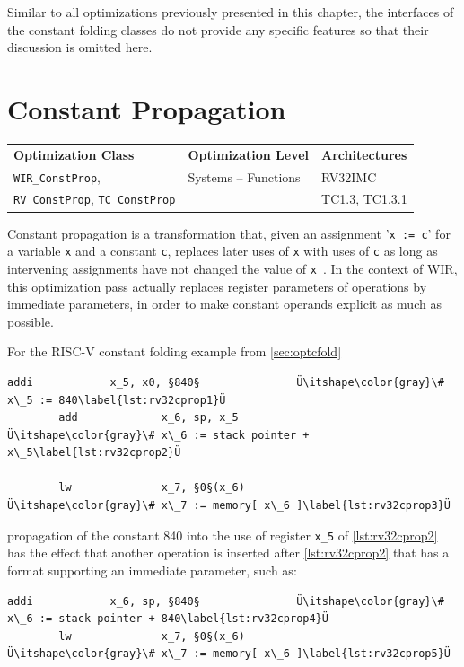 Similar to all optimizations previously presented in this chapter, the interfaces of the constant folding classes do not provide any specific features so that their discussion is omitted here.


\section{Constant Propagation}
\label{sec:optcprop}

\begin{tabular}{|l|l|l|}
  \hline
  \textbf{Optimization Class} & \textbf{Optimization Level} & \textbf{Architectures} \\
  \hhline{|=|=|=|}
  \texttt{WIR\_ConstProp}, & Systems -- Functions & RV32IMC \\
  \texttt{RV\_ConstProp}, \texttt{TC\_ConstProp} & & TC1.3, TC1.3.1 \\
  \hline
\end{tabular}

Constant propagation is a transformation that, given an assignment '\texttt{x := c}' for a variable \texttt{x} and a constant \texttt{c}, replaces later uses of \texttt{x} with uses of \texttt{c} as long as intervening assignments have not changed the value of \texttt{x}~\cite[chapter~12.6]{Much97}.
In the context of \gls{WIR}, this optimization pass actually replaces register parameters of operations by immediate parameters, in order to make constant operands explicit as much as possible.

\begin{wirExample}
For the RISC-V constant folding example from \cref{sec:optcfold}
\begin{lstlisting}[style=code,firstnumber=4]
        addi            x_5, x0, §840§               Ü\itshape\color{gray}\# x\_5 := 840\label{lst:rv32cprop1}Ü
        add             x_6, sp, x_5               Ü\itshape\color{gray}\# x\_6 := stack pointer + x\_5\label{lst:rv32cprop2}Ü

        lw              x_7, §0§(x_6)                Ü\itshape\color{gray}\# x\_7 := memory[ x\_6 ]\label{lst:rv32cprop3}Ü
\end{lstlisting}
propagation of the constant 840 into the use of register \texttt{x\_5} of \cref{lst:rv32cprop2} has the effect that another operation is inserted after \cref{lst:rv32cprop2} that has a format supporting an immediate parameter, such as:
\begin{lstlisting}[style=code,firstnumber=6]
        addi            x_6, sp, §840§               Ü\itshape\color{gray}\# x\_6 := stack pointer + 840\label{lst:rv32cprop4}Ü
        lw              x_7, §0§(x_6)                Ü\itshape\color{gray}\# x\_7 := memory[ x\_6 ]\label{lst:rv32cprop5}Ü
\end{lstlisting}
\end{wirExample}

